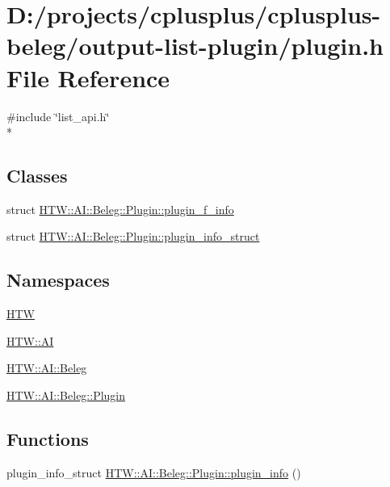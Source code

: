 \hypertarget{output-list-plugin_2plugin_8h}{\section{D\-:/projects/cplusplus/cplusplus-\/beleg/output-\/list-\/plugin/plugin.h File Reference}
\label{output-list-plugin_2plugin_8h}
}
{\ttfamily \#include \char`\"{}list\-\_\-api.\-h\char`\"{}}\\*
\subsection*{Classes}
\begin{DoxyCompactItemize}
\item 
struct \hyperlink{struct_h_t_w_1_1_a_i_1_1_beleg_1_1_plugin_1_1plugin__f__info}{H\-T\-W\-::\-A\-I\-::\-Beleg\-::\-Plugin\-::plugin\-\_\-f\-\_\-info}
\item 
struct \hyperlink{struct_h_t_w_1_1_a_i_1_1_beleg_1_1_plugin_1_1plugin__info__struct}{H\-T\-W\-::\-A\-I\-::\-Beleg\-::\-Plugin\-::plugin\-\_\-info\-\_\-struct}
\end{DoxyCompactItemize}
\subsection*{Namespaces}
\begin{DoxyCompactItemize}
\item 
\hyperlink{namespace_h_t_w}{H\-T\-W}
\item 
\hyperlink{namespace_h_t_w_1_1_a_i}{H\-T\-W\-::\-A\-I}
\item 
\hyperlink{namespace_h_t_w_1_1_a_i_1_1_beleg}{H\-T\-W\-::\-A\-I\-::\-Beleg}
\item 
\hyperlink{namespace_h_t_w_1_1_a_i_1_1_beleg_1_1_plugin}{H\-T\-W\-::\-A\-I\-::\-Beleg\-::\-Plugin}
\end{DoxyCompactItemize}
\subsection*{Functions}
\begin{DoxyCompactItemize}
\item 
plugin\-\_\-info\-\_\-struct \hyperlink{namespace_h_t_w_1_1_a_i_1_1_beleg_1_1_plugin_a09f048dbac5b6f35fca9900b50aa9224}{H\-T\-W\-::\-A\-I\-::\-Beleg\-::\-Plugin\-::plugin\-\_\-info} ()
\end{DoxyCompactItemize}
